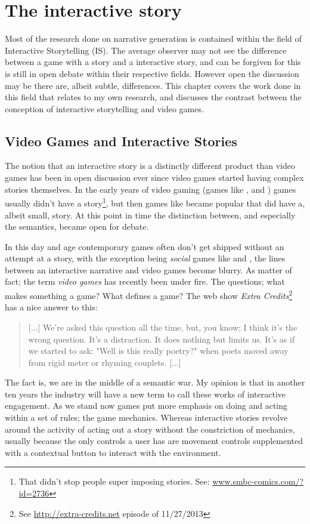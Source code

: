 \chapter{The interactive story}
\label{ch:is}
Most of the research done on narrative generation is contained within the field of Interactive Storytelling (IS). The average observer may not see the difference between a game with a story and a interactive story, and can be forgiven for this is still in open debate within their respective fields. However open the discussion may be there are, albeit subtle, differences. This chapter covers the work done in this field that relates to my own research, and discusses the contrast between the conception of interactive storytelling and video games.

\section{Video Games and Interactive Stories}
The notion that an interactive story is a distinctly different product than video games has been in open discussion ever since video games started having complex stories themselves. In the early years of video gaming (games like ,  and ) games usually didn't have a story\footnote{That didn't stop people super imposing stories. See: \url{www.smbc-comics.com/?id=2736}}, but then games like  became popular that did have a, albeit small, story. At this point in time the distinction between, and especially the semantics, became open for debate.

In this day and age contemporary games often don't get shipped without an attempt at a story, with the exception being \textit{social} games like  and , the lines between an interactive narrative and video games become blurry. As matter of fact; the term \textit{video games} has recently been under fire. The questions; what makes something a game? What defines a game? The web show \textit{Extra Credits}\footnote{See \url{http://extra-credits.net} episode of 11/27/2013} has a nice answer to this: 
\begin{quote}
[...] We're asked this question all the time, but, you know; I think it's the wrong question. It's a distraction. It does nothing but limits us. It's as if we started to ask: "Well is this really poetry?" when poets moved away from rigid meter or rhyming couplets. [...]
\end{quote}
The fact is, we are in the middle of a semantic war. My opinion is that in another ten years the industry will have a new term to call these works of interactive engagement. As we stand now games put more emphasis on doing and acting within a set of rules; the game mechanics. Whereas interactive stories revolve around the activity of acting out a story without the constriction of mechanics, usually because the only controls a user has are movement controls supplemented with a contextual button to interact with the environment.
 

